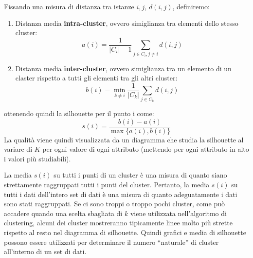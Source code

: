 Fissando una misura di distanza tra istanze $i,j$, $d(i, j)$, definiremo:
\begin{enumerate}
    \item Distanza media \textbf{intra-cluster}, ovvero simiglianza tra elementi
    dello stesso cluster:
        \begin{equation}
            a(i) = \frac{1}{|C_i| - 1} \sum_{j \in C_i, j \neq i} d(i, j)
        \end{equation}
    \item Distanza media \textbf{inter-cluster}, ovvero simiglianza tra un elemento
    di un claster rispetto a tutti gli elementi tra gli altri cluster:
        \begin{equation}
            b(i) = \min_{k \neq i} \frac{1}{|C_k|} \sum_{j \in C_k} d(i, j)
        \end{equation}
\end{enumerate}
ottenendo quindi la silhouette per il punto i come:
\begin{equation}
    s(i) = \frac{b(i) - a(i)}{\max\{a(i), b(i)\}}
\end{equation}
La qualità viene quindi visualizzata da un diagramma che studia la silhouette al
variare di $K$ per ogni valore di ogni attributo (mettendo per ogni attributo in
alto i valori più studiabili).

La media $s(i)$ su tutti i punti di un cluster è una misura di quanto siano
strettamente raggruppati tutti i punti del cluster. Pertanto, la media $s(i)$ su
tutti i dati dell'intero set di dati è una misura di quanto adeguatamente i dati
sono stati raggruppati. Se ci sono troppi o troppo pochi cluster, come può accadere
quando una scelta sbagliata di $k$ viene utilizzata nell'algoritmo di clustering,
alcuni dei cluster mostreranno tipicamente linee molto più strette rispetto al
resto nel diagramma di silhouette. Quindi grafici e media di silhouette possono
essere utilizzati per determinare il numero “naturale” di cluster all'interno di
un set di dati.